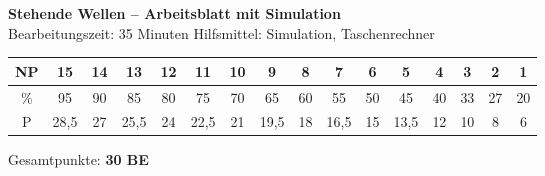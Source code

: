 \documentclass[11pt,a4paper]{article}
\begin{document}
\begin{center}
\Large\textbf{Stehende Wellen -- Arbeitsblatt mit Simulation}\\[0.2cm]
\small Bearbeitungszeit: 35 Minuten \hfill Hilfsmittel: Simulation, Taschenrechner
\end{center}

\vspace{0.2cm}

\begin{center}
\tiny
\begin{tabular}{|c|c|c|c|c|c|c|c|c|c|c|c|c|c|c|c|}
\hline
NP & 15 & 14 & 13 & 12 & 11 & 10 & 9 & 8 & 7 & 6 & 5 & 4 & 3 & 2 & 1 \\
\hline
\% & 95 & 90 & 85 & 80 & 75 & 70 & 65 & 60 & 55 & 50 & 45 & 40 & 33 & 27 & 20 \\
\hline
P & 28,5 & 27 & 25,5 & 24 & 22,5 & 21 & 19,5 & 18 & 16,5 & 15 & 13,5 & 12 & 10 & 8 & 6 \\
\hline
\end{tabular}
\end{center}

\begin{center}
\small Gesamtpunkte: \textbf{30 BE}
\end{center}

\vspace{0.3cm}
\end{document}
